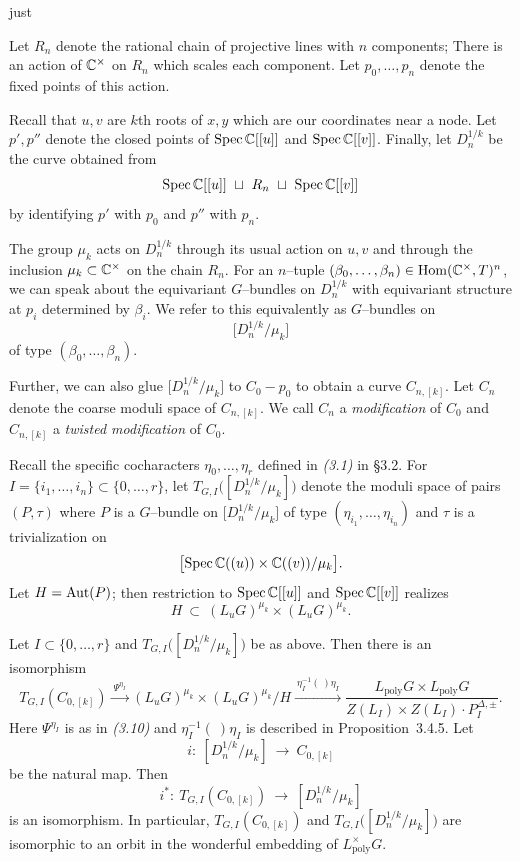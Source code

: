 just \documentclass[12pt]{article}
\begin{document}
\medskip

Let $R_n$ denote the rational chain of projective lines with $n$ components;
There is an action of $\mathbb{C}^\times$ on $R_n$ which scales each component.  Let $p_0,\dots,p_n$ denote the fixed points of this action.

Recall that $u,v$ are $k$th roots of $x,y$ which are our coordinates near a node.
Let $p',p''$ denote the closed points of $\operatorname{Spec} \mathbb{C}[[u]]$ and $\operatorname{Spec} \mathbb{C}[[v]]$.
Finally, let $D^{1/k}_n$ be the curve obtained from
\[
\Spec \C[[u]]\ \sqcup\ R_n\ \sqcup\ \Spec \C[[v]]
\]
by identifying $p'$ with $p_0$ and $p''$ with $p_n$.

The group $\mu_k$ acts on $D^{1/k}_n$ through its usual action on $u,v$ and
through the inclusion $\mu_k\subset \mathbb{C}^\times$ on the chain $R_n$.
For an $n$--tuple $(\beta_0,\dots,\beta_n)\in \operatorname{Hom}(\mathbb{C}^\times,T)^n$, we can speak
about the equivariant $G$--bundles on $D^{1/k}_n$ with equivariant structure at
$p_i$ determined by $\beta_i$.  We refer to this equivalently as $G$--bundles on
\[
\bigl[D^{1/k}_n/\mu_k\bigr]
\]
of type $(\beta_0,\dots,\beta_n)$.

Further, we can also glue $\bigl[D^{1/k}_n/\mu_k\bigr]$ to $C_0-p_0$ to obtain a
curve $C_{n,[k]}$.  Let $C_n$ denote the coarse moduli space of $C_{n,[k]}$.
We call $C_n$ a \emph{modification} of $C_0$ and $C_{n,[k]}$ a \emph{twisted
modification} of $C_0$.

\medskip

Recall the specific cocharacters $\eta_0,\dots,\eta_r$ defined in \emph{(3.1)} in
\S3.2.  For $I=\{i_1,\dots,i_n\}\subset \{0,\dots,r\}$, let
$T_{G,I}\!\bigl([D^{1/k}_n/\mu_k]\bigr)$ denote the moduli space of pairs $(P,\tau)$
where $P$ is a $G$--bundle on $\bigl[D^{1/k}_n/\mu_k\bigr]$ of type
$(\eta_{i_1},\dots,\eta_{i_n})$ and $\tau$ is a trivialization on
\[
\bigl[\operatorname{Spec} \mathbb{C}((u))\times \mathbb{C}((v))/\mu_k\bigr].
\]
Let $H=\operatorname{Aut}(P)$; then restriction to $\operatorname{Spec} \mathbb{C}[[u]]$ and $\operatorname{Spec} \mathbb{C}[[v]]$ realizes
\[
H\ \subset\ (L_u G)^{\mu_k}\times (L_u G)^{\mu_k}.
\]

\begin{theorem}
Let $I\subset \{0,\dots,r\}$ and $T_{G,I}\!\bigl([D^{1/k}_n/\mu_k]\bigr)$ be as
above.  Then there is an isomorphism
\[
T_{G,I}(C_{0,[k]})
\xrightarrow{\ \Psi^{\eta_I}\ }
(L_u G)^{\mu_k}\times (L_u G)^{\mu_k}/H
\xrightarrow{\ \eta_I^{-1}(\ )\eta_I\ }
\frac{L_{\mathrm{poly}}G\times L_{\mathrm{poly}}G}
{Z(L_I)\times Z(L_I)\cdot P_I^{\Delta,\pm}}.
\]
Here $\Psi^{\eta_I}$ is as in \emph{(3.10)} and $\eta_I^{-1}(\ )\eta_I$ is
described in Proposition~3.4.5.  Let
\[
i:\ [D^{1/k}_n/\mu_k]\ \longrightarrow\ C_{0,[k]}
\]
be the natural map.  Then
\[
i^*:\ T_{G,I}(C_{0,[k]})\ \longrightarrow\ [D^{1/k}_n/\mu_k]
\]
is an isomorphism.  In particular,
$T_{G,I}(C_{0,[k]})$ and $T_{G,I}\!\bigl([D^{1/k}_n/\mu_k]\bigr)$ are isomorphic to
an orbit in the wonderful embedding of $L_{\mathrm{poly}}^{\times}G$.
\end{theorem}
\end{document}

